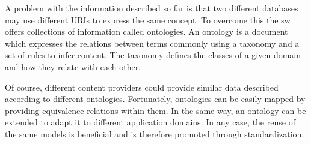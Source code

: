 

A problem with the information described so far is that two different databases may use different URIs to express the same concept.
To overcome this the \ac{sw} offers collections of information called ontologies.
An ontology is a document which expresses the relations between terms commonly using a taxonomy and a set of rules to infer content.
The taxonomy defines the classes of a given domain and how they relate with each other.

Of course, different content providers could provide similar data described according to different ontologies.
Fortunately, ontologies can be easily mapped by providing equivalence relations within them.
In the same way, an ontology can be extended to adapt it to different application domains.
In any case, the reuse of the same models is beneficial and is therefore promoted through standardization.

